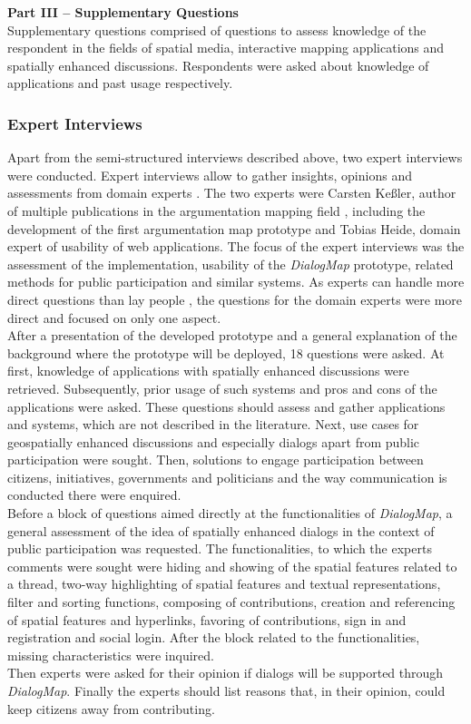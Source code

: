 \textbf{Part III -- Supplementary Questions}\\
Supplementary questions comprised of questions to assess knowledge of the respondent in the fields of spatial media, interactive mapping applications and spatially enhanced discussions. Respondents were asked about knowledge of applications and past usage respectively.

\subsubsection{Expert Interviews}
Apart from the semi-structured interviews described above, two expert interviews were conducted. Expert interviews allow to gather insights, opinions and assessments from domain experts \cite{hopf20045}. The two experts were Carsten Ke{\ss}ler, author of multiple publications in the argumentation mapping field \cite{Kessler2005_ArgumentationMapPrototype,kessler_argumap,Kessler2005_Conflict_Resolution}, including the development of the first argumentation map prototype and Tobias Heide, domain expert of usability of web applications. The focus of the expert interviews was the assessment of the implementation, usability of the \textit{DialogMap} prototype, related methods for public participation and similar systems. As experts can handle more direct questions than lay people \cite{helfferich2005}, the questions for the domain experts were more direct and focused on only one aspect.\\
After a presentation of the developed prototype and a general explanation of the background where the prototype will be deployed, 18 questions were asked. At first, knowledge of applications with spatially enhanced discussions were retrieved. Subsequently, prior usage of such systems and pros and cons of the applications were asked. These questions should assess and gather applications and systems, which are not described in the literature. Next, use cases for geospatially enhanced discussions and especially dialogs apart from public participation were sought. Then, solutions to engage participation between citizens, initiatives, governments and politicians and the way communication is conducted there were enquired.\\
Before a block of questions aimed directly at the functionalities of \textit{DialogMap}, a general assessment of the idea of spatially enhanced dialogs in the context of public participation was requested. The functionalities, to which the experts comments were sought were hiding and showing of the spatial features related to a thread, two-way highlighting of spatial features and textual representations, filter and sorting functions, composing of contributions, creation and referencing of spatial features and hyperlinks, favoring of contributions, sign in and registration and social login. After the block related to the functionalities, missing characteristics were inquired.\\
Then experts were asked for their opinion if dialogs will be supported through \textit{DialogMap}. Finally the experts should list reasons that, in their opinion, could keep citizens away from contributing.

